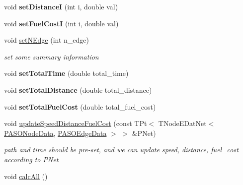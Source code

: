 \begin{DoxyCompactItemize}
\item 
\hypertarget{class_p_a_s_o_solution_aea5c659e6a79432ec52c1016928def05}{}void {\bfseries set\+Distance\+I} (int i, double val)\label{class_p_a_s_o_solution_aea5c659e6a79432ec52c1016928def05}

\item 
\hypertarget{class_p_a_s_o_solution_ac94703a62a15cf3a88f246cea469da2a}{}void {\bfseries set\+Fuel\+Cost\+I} (int i, double val)\label{class_p_a_s_o_solution_ac94703a62a15cf3a88f246cea469da2a}

\item 
\hypertarget{class_p_a_s_o_solution_ad77c96ccee6abeffa53f51a6d8e7ec9f}{}void \hyperlink{class_p_a_s_o_solution_ad77c96ccee6abeffa53f51a6d8e7ec9f}{set\+N\+Edge} (int n\+\_\+edge)\label{class_p_a_s_o_solution_ad77c96ccee6abeffa53f51a6d8e7ec9f}

\begin{DoxyCompactList}\small\item\em set some summary information \end{DoxyCompactList}\item 
\hypertarget{class_p_a_s_o_solution_a3ea9e9cd75912548c19e2a76f4feb48c}{}void {\bfseries set\+Total\+Time} (double total\+\_\+time)\label{class_p_a_s_o_solution_a3ea9e9cd75912548c19e2a76f4feb48c}

\item 
\hypertarget{class_p_a_s_o_solution_a8812ee76d6e033890589e0b768cc7a20}{}void {\bfseries set\+Total\+Distance} (double total\+\_\+distance)\label{class_p_a_s_o_solution_a8812ee76d6e033890589e0b768cc7a20}

\item 
\hypertarget{class_p_a_s_o_solution_a71b8ebbb0411f1af4e282fe89f751602}{}void {\bfseries set\+Total\+Fuel\+Cost} (double total\+\_\+fuel\+\_\+cost)\label{class_p_a_s_o_solution_a71b8ebbb0411f1af4e282fe89f751602}

\item 
\hypertarget{class_p_a_s_o_solution_abc75d29163747bc4fc6dcdb8cc2bf894}{}void \hyperlink{class_p_a_s_o_solution_abc75d29163747bc4fc6dcdb8cc2bf894}{update\+Speed\+Distance\+Fuel\+Cost} (const T\+Pt$<$ T\+Node\+E\+Dat\+Net$<$ \hyperlink{class_p_a_s_o_node_data}{P\+A\+S\+O\+Node\+Data}, \hyperlink{class_p_a_s_o_edge_data}{P\+A\+S\+O\+Edge\+Data} $>$ $>$ \&P\+Net)\label{class_p_a_s_o_solution_abc75d29163747bc4fc6dcdb8cc2bf894}

\begin{DoxyCompactList}\small\item\em path and time should be pre-\/set, and we can update speed, distance, fuel\+\_\+cost according to P\+Net \end{DoxyCompactList}\item 
\hypertarget{class_p_a_s_o_solution_abbef9e82bbaafe2f4a872942fa56e35b}{}void \hyperlink{class_p_a_s_o_solution_abbef9e82bbaafe2f4a872942fa56e35b}{calc\+All} ()\label{class_p_a_s_o_solution_abbef9e82bbaafe2f4a872942fa56e35b}


\end{DoxyCompactItemize}
